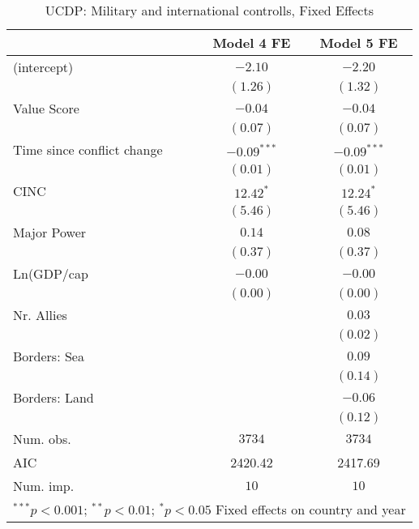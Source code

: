 
\begin{table}
\begin{center}
\begin{tabular}{l c c}
\toprule
 & Model 4 FE & Model 5 FE \\
\midrule
(intercept)                & $-2.10$       & $-2.20$       \\
                           & $(1.26)$      & $(1.32)$      \\
Value Score                & $-0.04$       & $-0.04$       \\
                           & $(0.07)$      & $(0.07)$      \\
Time since conflict change & $-0.09^{***}$ & $-0.09^{***}$ \\
                           & $(0.01)$      & $(0.01)$      \\
CINC                       & $12.42^{*}$   & $12.24^{*}$   \\
                           & $(5.46)$      & $(5.46)$      \\
Major Power                & $0.14$        & $0.08$        \\
                           & $(0.37)$      & $(0.37)$      \\
Ln(GDP/cap                 & $-0.00$       & $-0.00$       \\
                           & $(0.00)$      & $(0.00)$      \\
Nr. Allies                 &               & $0.03$        \\
                           &               & $(0.02)$      \\
Borders: Sea               &               & $0.09$        \\
                           &               & $(0.14)$      \\
Borders: Land              &               & $-0.06$       \\
                           &               & $(0.12)$      \\
\midrule
Num. obs.                  & $3734$        & $3734$        \\
AIC                        & 2420.42       & 2417.69       \\
Num. imp.                  & $10$          & $10$          \\
\bottomrule
\multicolumn{3}{l}{\scriptsize{$^{***}p<0.001$; $^{**}p<0.01$; $^{*}p<0.05$ 
 Fixed effects on country and year}}
\end{tabular}
\caption{UCDP: Military and international controlls, Fixed Effects}
\label{UCDP_2_FE}
\end{center}
\end{table}
